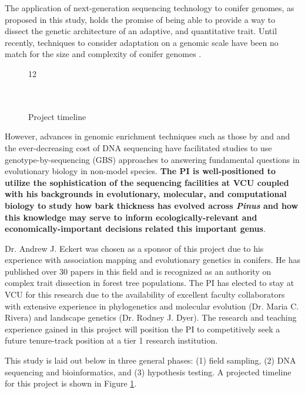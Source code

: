 The application of next-generation sequencing technology to conifer genomes, as proposed in this study, holds the promise of 
being able to provide a way to dissect the genetic architecture of an adaptive, and quantitative trait.  Until recently, techniques 
to consider adaptation on a genomic scale have been no match for the size and complexity of conifer genomes \citep{Mackay:2012hr}.  
\begin{figure}
	\begin{ganttchart}[vgrid,
	bar/.style={fill=gray!40}, 
	title/.style={fill=gray!10}]{12}
	\\
	\\
	\\
	\end{ganttchart}
\caption{Project timeline}
\vspace{-10pt}
\label{f:timeline}
\end{figure}
However, advances in genomic enrichment techniques such as those by \citet{Parchman:2012ca} and \citet{Willing:2011jb} and 
the ever-decreasing cost of DNA sequencing have facilitated studies to use genotype-by-sequencing (GBS) approaches to 
answering fundamental questions in evolutionary biology in non-model species.  \textbf{The PI is well-positioned to utilize the 
sophistication of the sequencing facilities at VCU coupled with his backgrounds in evolutionary, molecular, and 
computational biology to study how bark thickness has evolved across \emph{Pinus} and how this knowledge may serve to 
inform ecologically-relevant and economically-important decisions related this important genus}.

Dr. Andrew J. Eckert was chosen as a sponsor of this project due to his experience with association mapping 
and evolutionary genetics in conifers. He has published over 30 papers in this field and is recognized as an authority 
on complex trait dissection in forest tree populations.  The PI has elected to stay at VCU for this research due to the availability 
of excellent faculty collaborators with extensive experience in phylogenetics and molecular evolution (Dr. Maria C. Rivera) and 
landscape genetics (Dr. Rodney J. Dyer).  The research and teaching experience gained in this project will position the PI to 
competitively seek a future tenure-track position at a tier 1 research institution.      

This study is laid out below in three general phases: (1) field sampling, (2) DNA sequencing and bioinformatics, and (3) 
hypothesis testing.  A projected timeline for this project is shown in Figure \ref{f:timeline}.

